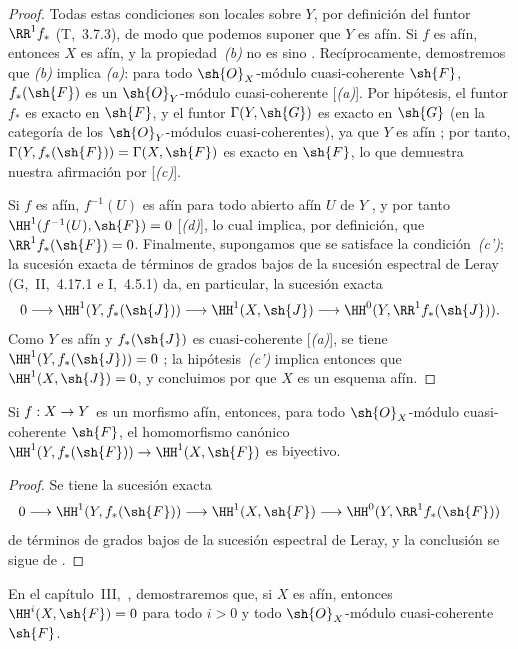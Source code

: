 \documentclass[oneside,10pt]{amsart}
\makeatletter
\newcommand{\ega@arrow}[2]{\mathchoice{#1}{#2}{#2}{#2}}
\renewcommand{\to}{\ega@arrow{\longrightarrow}{\rightarrow}}
\newcommand{\oldpage}[2][]{\marginnote{\normalfont\footnotesize\textbf{#1}~|~#2}\ignorespaces}
\let\EGAOriginalLabel\label
\renewcommand{\label}[1]{\phantomsection\EGAOriginalLabel{#1}}
\makeatother
\begin{document}
\begin{proof}
Todas estas condiciones son locales sobre $Y$, por definición del funtor $\RR^1f_*$ (T,~3.7.3), de modo que podemos suponer que $Y$ es afín.
Si $f$ es afín, entonces $X$ es afín, y la propiedad~\emph{(b)} no es sino .
Recíprocamente, demostremos que \emph{(b)} implica \emph{(a)}:
para todo $\sh{O}_X$-módulo cuasi-coherente $\sh{F}$, $f_*(\sh{F})$ es un $\sh{O}_Y$-módulo cuasi-coherente [\emph{(a)}].
Por hipótesis, el funtor $f_*$ es exacto en $\sh{F}$, y el funtor $\Gamma(Y,\sh{G})$ es exacto en $\sh{G}$ (en la categoría de los $\sh{O}_Y$-módulos cuasi-coherentes), ya que $Y$ es afín ;
por tanto, $\Gamma(Y,f_*(\sh{F}))=\Gamma(X,\sh{F})$ es exacto en $\sh{F}$, lo que demuestra nuestra afirmación por [\emph{(c)}].

Si $f$ es afín, $f^{-1}(U)$ es afín para todo abierto afín $U$ de $Y$ , y por tanto $\HH^1(f^{-1}(U),\sh{F})=0$ [\emph{(d)}], lo cual implica, por definición, que $\RR^1f_*(\sh{F})=0$.
Finalmente, supongamos que se satisface la condición~\emph{(c')};
la sucesión exacta de términos de grados bajos de la sucesión espectral de Leray (G,~II,~4.17.1 e I,~4.5.1) da, en particular, la sucesión exacta
\[
  0\to\HH^1(Y,f_*(\sh{J}))\to\HH^1(X,\sh{J})\to\HH^0(Y,\RR^1f_*(\sh{J})).
\]
Como $Y$ es afín y $f_*(\sh{J})$ es cuasi-coherente [\emph{(a)}], se tiene $\HH^1(Y,f_*(\sh{J}))=0$ ;
la hipótesis~\emph{(c')} implica entonces que $\HH^1(X,\sh{J})=0$, y concluimos por  que $X$ es un esquema afín.
\end{proof}

\begin{corollary}[5.2.3]
\label{II.5.2.3}
Si $f:X\to Y$ es un morfismo afín, entonces, para todo $\sh{O}_X$-módulo cuasi-coherente $\sh{F}$, el homomorfismo canónico $\HH^1(Y,f_*(\sh{F}))\to\HH^1(X,\sh{F})$ es biyectivo.
\end{corollary}

\oldpage[II]{99}
\begin{proof}
Se tiene la sucesión exacta
\[
  0\to\HH^1(Y,f_*(\sh{F}))\to\HH^1(X,\sh{F})\to\HH^0(Y,\RR^1f_*(\sh{F}))
\]
de términos de grados bajos de la sucesión espectral de Leray, y la conclusión se sigue de .
\end{proof}

\begin{remark}[5.2.4]
\label{II.5.2.4}
En el capítulo~III,~, demostraremos que, si $X$ es afín, entonces $\HH^i(X,\sh{F})=0$ para todo $i>0$ y todo $\sh{O}_X$-módulo cuasi-coherente $\sh{F}$.
\end{remark}
\end{document}
